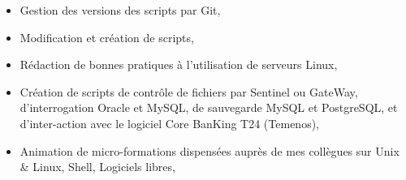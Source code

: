 {\begin{itemize}
\begin{itemize}
                \item{Gestion des versions des scripts par Git,}
                \item{Modification et création de scripts,}
                \item{Rédaction de bonnes pratiques à l'utilisation de serveurs Linux,}
                \item{Création de scripts de contrôle de fichiers par Sentinel ou GateWay, d'interrogation Oracle et MySQL, de sauvegarde MySQL et PostgreSQL, et d'inter-action avec le logiciel Core BanKing T24 (Temenos),}
                \item{Animation de micro-formations dispensées auprès de mes collègues sur Unix \& Linux, Shell, Logiciels libres,}
            \end{itemize}
    \end{itemize}}


